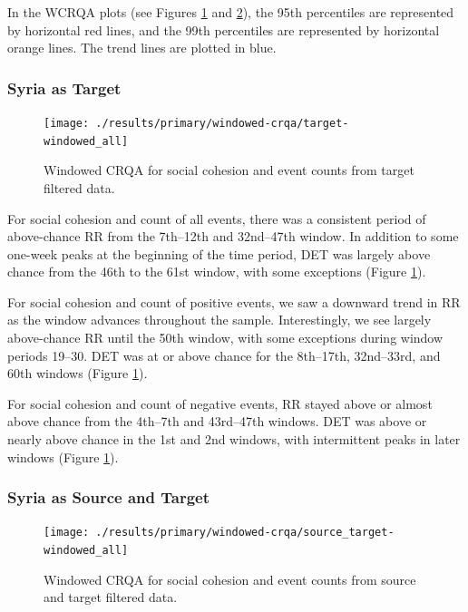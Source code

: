 \documentclass[english,man]{apa6}
\begin{document}
In the WCRQA plots (see Figures \ref{fig:plot-wcrqa-targ-all} and
\ref{fig:plot-wcrqa-source-targ-all}), the 95th percentiles are represented by
horizontal red lines, and the 99th percentiles are represented by horizontal
orange lines. The trend lines are plotted in blue.

\hypertarget{syria-as-target-1}{%
\subsubsection{Syria as Target}\label{syria-as-target-1}}

\begin{figure}
\texttt{[image: ./results/primary/windowed-crqa/target-windowed\_all]} \caption{Windowed CRQA for social cohesion and event counts from target filtered data.}\label{fig:plot-wcrqa-targ-all}
\end{figure}

For social cohesion and count of all events, there was a consistent period of
above-chance RR from the 7th--12th and 32nd--47th window. In addition to some
one-week peaks at the beginning of the time period, DET was largely above chance
from the 46th to the 61st window, with some exceptions (Figure
\ref{fig:plot-wcrqa-targ-all}).

For social cohesion and count of positive events, we saw a downward trend in RR
as the window advances throughout the sample. Interestingly, we see largely
above-chance RR until the 50th window, with some exceptions during window
periods 19--30. DET was at or above chance for the 8th--17th, 32nd--33rd, and
60th windows (Figure \ref{fig:plot-wcrqa-targ-all}).

For social cohesion and count of negative events, RR stayed above or almost
above chance from the 4th--7th and 43rd--47th windows. DET was above or nearly
above chance in the 1st and 2nd windows, with intermittent peaks in later
windows (Figure \ref{fig:plot-wcrqa-targ-all}).

\hypertarget{syria-as-source-and-target-1}{%
\subsubsection{Syria as Source and Target}\label{syria-as-source-and-target-1}}

\begin{figure}
\texttt{[image: ./results/primary/windowed-crqa/source\_target-windowed\_all]} \caption{Windowed CRQA for social cohesion and event counts from source and target filtered data.}\label{fig:plot-wcrqa-source-targ-all}
\end{figure}
\end{document}
